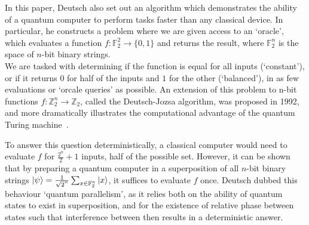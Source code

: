 \documentclass{standalone}
\begin{document}
\par
In this paper, Deutsch also set out an algorithm which demonstrates the ability of a quantum computer to perform tasks faster than any classical device. In particular, he constructs a problem where we are given access to an `oracle', which evaluates a function $f:\mathbb{F}_{2}^{2}\rightarrow\{0,1\}$ and returns the result, where $\mathbb{F}_{2}^{n}$ is the space of $n$-bit binary strings.\\
We are tasked with determining if the function is equal for all inputs (`constant'), or if it returns $0$ for half of the inputs and $1$ for the other (`balanced'), in as few evaluations or `orcale queries' as possible. An extension of this problem to n-bit functions $f:\mathbb{Z}_{2}^{n}\rightarrow\mathbb{Z}_{2}$, called the Deutsch-Jozsa algorithm, was proposed in 1992, and more dramatically illustrates the computational advantage of the quantum Turing machine~\cite{Deutsch92}.
\par
To answer this question deterministically, a classical computer would need to evaluate $f$ for $\frac{2^{n}}{2}+1$ inputs, half of the possible set. However, it can be shown that by preparing a quantum computer in a superposition of all $n$-bit binary strings $\ket{\psi}=\frac{1}{\sqrt{2}^{n}}\sum_{x\in\mathbb{F}_{2}^{n}}\ket{x}$, it suffices to evaluate $f$ once. Deutsch dubbed this behaviour `quantum parallelism', as it relies both on the ability of quantum states to exist in superposition, and for the existence of relative phase between states such that interference between then results in a deterministic answer.
\par
\pagebreak
\end{document}
